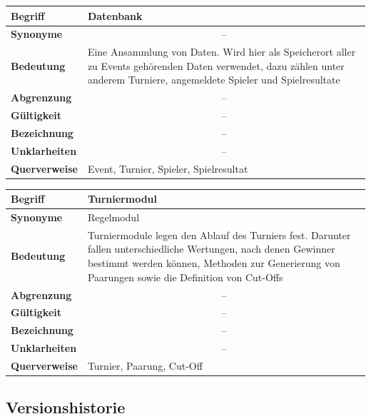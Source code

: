 \documentclass[11pt]{article}
\begin{document}
\begin{tabularx}{\textwidth}{| p{} | p{} |}
	\hline
	\textbf{Begriff} & Datenbank\\
	\hline
	\textbf{Synonyme} & \multicolumn{1}{|c|}{--} \\
	\hline
	\textbf{Bedeutung} & Eine Ansammlung von Daten. Wird hier als Speicherort aller zu Events gehörenden Daten verwendet, dazu zählen unter anderem Turniere, angemeldete Spieler und Spielresultate\\
	\hline
	\textbf{Abgrenzung} & \multicolumn{1}{|c|}{--} \\
	\hline
	\textbf{Gültigkeit} & \multicolumn{1}{|c|}{--} \\
	\hline
	\textbf{Bezeichnung} & \multicolumn{1}{|c|}{--} \\
	\hline
	\textbf{Unklarheiten} & \multicolumn{1}{|c|}{--} \\
	\hline
	\textbf{Querverweise} & Event, Turnier, Spieler, Spielresultat\\
	\hline
\end{tabularx}

\begin{tabularx}{\textwidth}{| p{} | p{} |}
	\hline
	\textbf{Begriff} & Turniermodul\\
	\hline
	\textbf{Synonyme} & Regelmodul\\
	\hline
	\textbf{Bedeutung} & Turniermodule legen den Ablauf des Turniers fest. Darunter fallen unterschiedliche Wertungen, nach denen Gewinner bestimmt werden können, Methoden zur Generierung von Paarungen sowie die Definition von Cut-Offs\\
	\hline
	\textbf{Abgrenzung} & \multicolumn{1}{|c|}{--} \\
	\hline
	\textbf{Gültigkeit} & \multicolumn{1}{|c|}{--} \\
	\hline
	\textbf{Bezeichnung} & \multicolumn{1}{|c|}{--} \\
	\hline
	\textbf{Unklarheiten} & \multicolumn{1}{|c|}{--} \\
	\hline
	\textbf{Querverweise} & Turnier, Paarung, Cut-Off\\
	\hline
\end{tabularx}

\newpage

\subsection{Versionshistorie}
\end{document}
